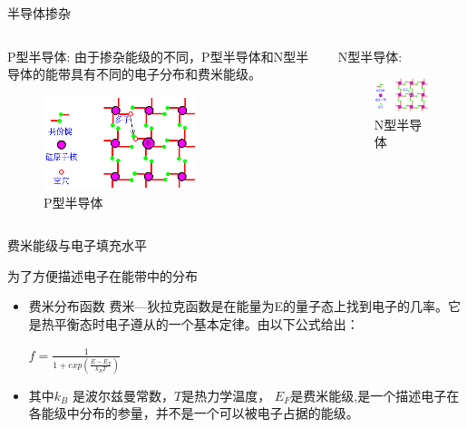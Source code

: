 \documentclass[trans]{beamer} %
\begin{document}
\begin{frame}{半导体掺杂}

    \begin{columns}
        \begin{column}{0.5\textwidth}
        
        \begin{exampleblock}{P型半导体:}
     由于掺杂能级的不同，P型半导体和N型半导体的能带具有不同的电子分布和费米能级。   
        
      \end{exampleblock}
             \begin{figure}[htbp] 
            \centering\includegraphics[width=1.75in]{source/ch2/fg218.png} \caption{P型半导体}
            \end{figure}
        \end{column}
        \begin{column}{0.5\textwidth}
        \begin{exampleblock}{N型半导体:}
     

      \end{exampleblock}
        \begin{figure}[htbp] 
            \centering\includegraphics[width=1.75in]{source/ch2/fg217.png} \caption{N型半导体} 
            \end{figure}
        
        \end{column}
        \end{columns}
\end{frame}  
\begin{frame}{费米能级与电子填充水平}

     为了方便描述电子在能带中的分布           
    \begin{itemize}
        \item 费米分布函数
费米—狄拉克函数是在能量为E的量子态上找到电子的几率。它是热平衡态时电子遵从的一个基本定律。由以下公式给出：

$f=\frac{1}{1+exp(\frac{E-E_F}{k_BT})}$
        \item 其中$k_B$  是波尔兹曼常数，$T$是热力学温度， $E_F$是费米能级,是一个描述电子在各能级中分布的参量，并不是一个可以被电子占据的能级。
        
            
            
       
        
    \end{itemize}
    
\end{frame}  
\end{document}

